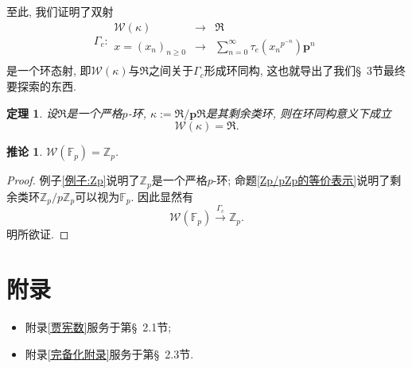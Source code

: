 \documentclass[UTF8, twoside]{ctexart}
\theoremstyle{nonumberplain}
\newtheorem{proof}{\heiti 证明}  %
\theoremstyle{nonumberplain}
\theoremstyle{plain}
\newtheorem{dingli4}[dingyi4]{定理}
\newtheorem{tuilun4}[dingyi4]{推论}
\begin{document}
	至此, 我们证明了双射
	\[
		{{\Gamma }_{c}}:\begin{matrix}
			\mathcal{W}\left( \kappa  \right) & \to  & \Re   \\
			x={{\left( {{x}_{n}} \right)}_{n\ge 0}} & \to  & \sum\limits_{n=0}^{\infty }{{{\tau }_{e}}\left( {{x}_{n}}^{{{p}^{-n}}} \right){\bm{p}^{n}}}  \\
		\end{matrix}
	\]
	是一个环态射, 即$\mathcal{W}\left( \kappa  \right)$与$\Re $之间关于${{\Gamma }_{c}}$形成环同构, 这也就导出了我们\S~3节最终要探索的东西.
	\begin{dingli4}
		设$\Re $是一个严格$p$-环, $\kappa :=\Re /\bm{p}\Re $是其剩余类环,  则在环同构意义下成立
		\[
			\mathcal{W}\left( \kappa  \right)=\Re .
		\]
	\end{dingli4}
	\begin{tuilun4}
		$\mathcal{W}\left( {{\mathbb{F}}_{p}} \right)
		=
		{{\mathbb{Z}}_{p}}$.
	\end{tuilun4}
	\begin{proof}
		例子\ref{例子:Zp}说明了${{\mathbb{Z}}_{p}}$是一个严格$p$-环; 命题\ref{Zp/pZp的等价表示}说明了剩余类环${{\mathbb{Z}}_{p}}/p{{\mathbb{Z}}_{p}}$可以视为${{\mathbb{F}}_{p}}$. 因此显然有
		\[
			\mathcal{W}\left( {{\mathbb{F}}_{p}} \right)\xrightarrow{\Gamma_c} {{\mathbb{Z}}_{p}}.
		\]
		明所欲证.
	\end{proof}
	
%	
%	
	
	
	\newpage	
	\appendix
	\section{附录}
	\begin{itemize}
		\item 附录\ref{贾宪数}服务于第\S~2.1节;\ 
		
		\item 附录\ref{完备化附录}服务于第\S~2.3节.\ 
	\end{itemize}
	
\end{document}

